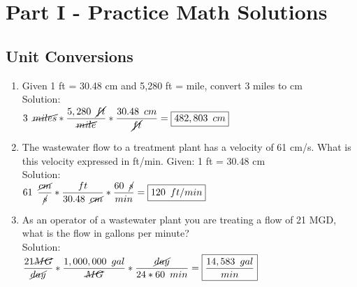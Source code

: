
\chapter{Part I - Practice Math Solutions}

\section{Unit Conversions}
\begin{enumerate}
\item Given 1 ft = 30.48 cm and 5,280 ft = mile, convert 3 miles to cm\\
Solution:\\
$3 \enspace \cancel{miles} * \dfrac{5,280 \enspace \cancel{ft}}{\cancel{mile}}*\dfrac{30.48 \enspace cm}{\cancel{ft}}=\boxed{482,803 \enspace cm}$

\item The wastewater flow to a treatment plant has a velocity of 61 cm/s. What is this velocity expressed in ft/min. Given: 1 ft = 30.48 cm\\
Solution:\\
$61 \enspace \dfrac{\cancel{cm}}{\cancel{s}} * \dfrac{ft}{30.48 \enspace \cancel{cm}}* \dfrac{60 \enspace \cancel{s}}{min} =  \boxed{120 \enspace ft/min}$\\

\item As an operator of a wastewater plant you are treating a flow of 21 MGD, what is the flow in gallons per minute?\\
Solution:\\
$\dfrac{21 \cancel{MG}}{\cancel{day}}*\dfrac{1,000,000 \enspace gal}{\cancel{MG}}*\dfrac{\cancel{day}}{24*60 \enspace min}=\boxed{\dfrac{14,583 \enspace gal}{min}}$\\
\end{enumerate}

\newpage

